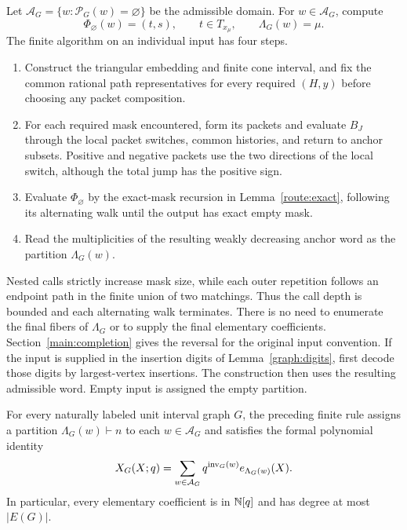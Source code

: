 Let $\mathcal A_G=\{w:\mathcal P_G(w)=\varnothing\}$ be the
admissible domain.  For $w\in\mathcal A_G$, compute
\[
 \Phi_{\varnothing}(w)=(t,s),\qquad t\in T_{x_\mu},
 \qquad \Lambda_G(w)=\mu.
\]
The finite algorithm on an individual input has four steps.
\begin{enumerate}
\item Construct the triangular embedding and finite cone interval, and
fix the common rational path representatives for every required $(H,y)$
before choosing any packet composition.
\item For each required mask encountered, form its packets and evaluate
$B_J$ through the local packet switches, common histories, and return
to anchor subsets. Positive and negative packets use the two directions
of the local switch, although the total jump has the positive sign.
\item Evaluate $\Phi_{\varnothing}$ by the exact-mask recursion in
Lemma~\ref{route:exact}, following its alternating walk until the output
has exact empty mask.
\item Read the multiplicities of the resulting weakly decreasing anchor
word as the partition $\Lambda_G(w)$.
\end{enumerate}
Nested calls strictly increase mask size, while each outer repetition
follows an endpoint path in the finite union of two matchings. Thus the
call depth is bounded and each alternating walk terminates. There is
no need to enumerate the final fibers of $\Lambda_G$ or to supply the
final elementary coefficients. Section~\ref{main:completion} gives the
reversal for the original input convention.
If the input is supplied in the insertion digits of
Lemma~\ref{graph:digits}, first decode those digits by largest-vertex
insertions.  The construction then uses the resulting admissible
word.  Empty input is assigned the empty partition.

\begin{theorem}
\label{route:witness}
For every naturally labeled unit interval graph $G$, the preceding
finite rule assigns a partition $\Lambda_G(w)\vdash n$ to each
$w\in\mathcal A_G$ and satisfies the formal polynomial identity
\begin{equation}
 \label{route:witness-identity}
 X_G(X;q)=\sum_{w\in\mathcal A_G}
                   q^{\operatorname{inv}_G(w)}e_{\Lambda_G(w)}(X).
\end{equation}
In particular, every elementary coefficient is in $\mathbb N[q]$ and has
degree at most $|E(G)|$.
\end{theorem}

